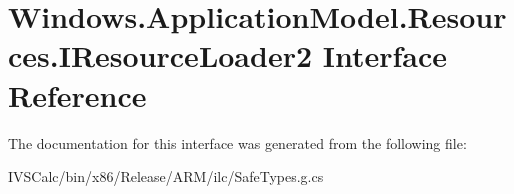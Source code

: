 \hypertarget{interface_windows_1_1_application_model_1_1_resources_1_1_i_resource_loader2}{}\section{Windows.\+Application\+Model.\+Resources.\+I\+Resource\+Loader2 Interface Reference}
\label{interface_windows_1_1_application_model_1_1_resources_1_1_i_resource_loader2}


The documentation for this interface was generated from the following file\+:\begin{DoxyCompactItemize}
\item 
I\+V\+S\+Calc/bin/x86/\+Release/\+A\+R\+M/ilc/Safe\+Types.\+g.\+cs\end{DoxyCompactItemize}
